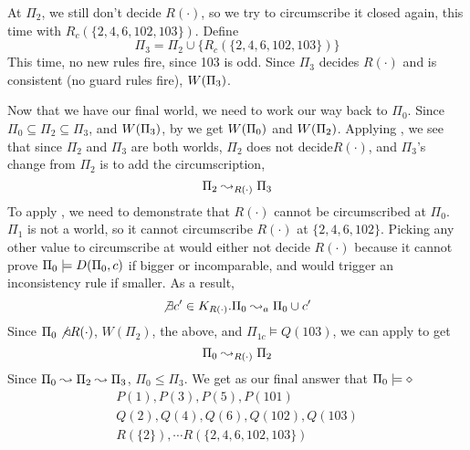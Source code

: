 At $\Pi_2$, we still don't decide $R(\cdot)$, so we try to circumscribe it closed again, this time with $R_c(\{2, 4, 6, 102, 103\})$.
Define
\[
	\Pi_3 = \Pi_2 \cup \{R_c(\{2, 4, 6, 102, 103\})\}
\]
This time, no new rules fire, since 103 is odd.
Since $\Pi_3$ decides $R(\cdot)$ and is consistent (no guard rules fire), $W({\Pi_3})$.

Now that we have our final world, we need to work our way back to $\Pi_0$.
Since $\Pi_0 \subseteq \Pi_2 \subseteq \Pi_3$, and $W({\Pi_3})$, by  we get $W({\Pi_0})$ and $W({\Pi_2})$.
Applying , we see that since $\Pi_2$ and $\Pi_3$ are both worlds, $\Pi_2$ does not decide$R(\cdot)$, and $\Pi_3$'s change from $\Pi_2$ is to add the circumscription,
\[
	\Pi_2 \leadsto_{R(\cdot)} \Pi_3
\]
To apply , we need to demonstrate that $R(\cdot)$ cannot be circumscribed at $\Pi_0$.
$\Pi_1$ is not a world, so it cannot circumscribe $R(\cdot)$ at $\{2, 4, 6, 102\}$.
Picking any other value to circumscribe at would either not decide $R(\cdot)$ because it cannot prove $\Pi_0 \models D(\Pi_0, c)$ if bigger or incomparable, and would trigger an inconsistency rule if smaller.
As a result,
\[
	\not \exists c' \in K_{R(\cdot)} . \Pi_0 \leadsto_a \Pi_0 \cup c'
\]
Since $\Pi_0 \not \triangleleft R(\cdot)$, $W(\Pi_2)$, the above, and $\Pi_{1c} \models Q(103)$, we can apply  to get
\[
	\Pi_0 \leadsto_{R(\cdot)} \Pi_2
\]
Since $\Pi_0 \leadsto \Pi_2 \leadsto \Pi_3$, $\Pi_0 \leq \Pi_3$.
We get as our final answer that $\Pi_0 \models \diamond$
\begin{align*}
	P(1), P(3), P(5), P(101)\\
	Q(2), Q(4), Q(6), Q(102), Q(103)\\
	R(\{2\}), \cdots R(\{2, 4, 6, 102, 103\})\\
\end{align*}
